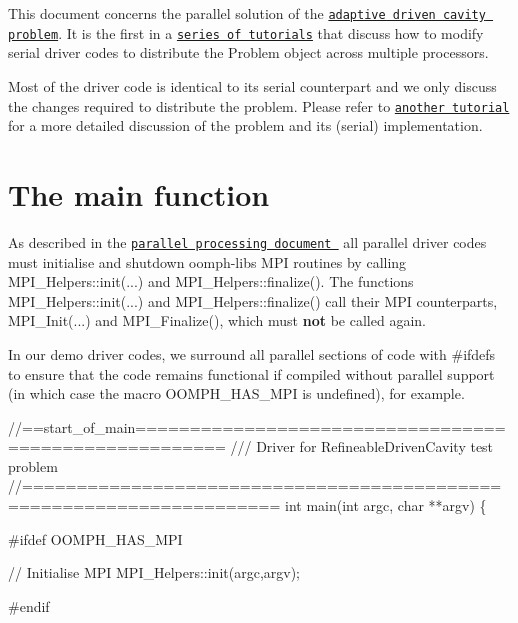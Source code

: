 This document concerns the parallel solution of the \href{../../../navier_stokes/adaptive_driven_cavity/html/index.html}{\tt adaptive driven cavity problem}. It is the first in a \href{../../../example_code_list/html/index.html#distributed}{\tt series of tutorials} that discuss how to modify serial driver codes to distribute the {\ttfamily Problem} object across multiple processors.

Most of the driver code is identical to its serial counterpart and we only discuss the changes required to distribute the problem. Please refer to \href{../../../navier_stokes/adaptive_driven_cavity/html/index.html}{\tt another tutorial} for a more detailed discussion of the problem and its (serial) implementation.



\hypertarget{index_main_body}{}\section{The main function}\label{index_main_body}
As described in the \href{../../general_mpi/html/index.html}{\tt parallel processing document } all parallel driver codes must initialise and shutdown oomph-\/lib\textquotesingle{}s M\+PI routines by calling {\ttfamily M\+P\+I\+\_\+\+Helpers\+::init}(...) and {\ttfamily M\+P\+I\+\_\+\+Helpers\+::finalize()}. The functions {\ttfamily M\+P\+I\+\_\+\+Helpers\+::init}(...) and {\ttfamily M\+P\+I\+\_\+\+Helpers\+::finalize()} call their M\+PI counterparts, {\ttfamily M\+P\+I\+\_\+\+Init}(...) and {\ttfamily M\+P\+I\+\_\+\+Finalize()}, which must {\bfseries not} be called again.

In our demo driver codes, we surround all parallel sections of code with {\ttfamily \#ifdefs} to ensure that the code remains functional if compiled without parallel support (in which case the macro {\ttfamily O\+O\+M\+P\+H\+\_\+\+H\+A\+S\+\_\+\+M\+PI} is undefined), for example.

 
\begin{DoxyCodeInclude}
\textcolor{comment}{//==start\_of\_main======================================================}
\textcolor{comment}{/// Driver for RefineableDrivenCavity test problem }
\textcolor{comment}{}\textcolor{comment}{//=====================================================================}
\textcolor{keywordtype}{int} main(\textcolor{keywordtype}{int} argc, \textcolor{keywordtype}{char} **argv)
\{

\textcolor{preprocessor}{#ifdef OOMPH\_HAS\_MPI}

 \textcolor{comment}{// Initialise MPI}
 MPI\_Helpers::init(argc,argv);

\textcolor{preprocessor}{#endif}

\end{DoxyCodeInclude}


